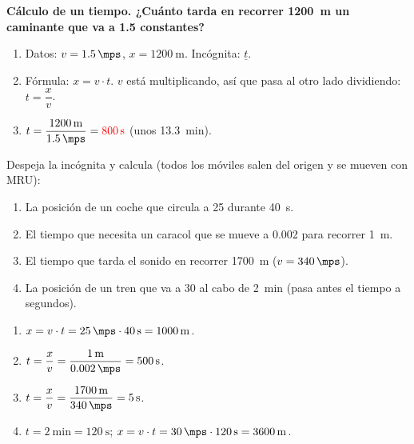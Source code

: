 \begin{example}
    \textbf{Cálculo de un tiempo. ¿Cuánto tarda en recorrer \qty{1200}{\m} un caminante que va a \qty{1.5}{\mps} constantes?}
    \begin{enumerate}[label=\numberballmDarkTeal]
        \item Datos: \(v = \qty{1.5}{\mps}\), \(x = \qty{1200}{\m}\). Incógnita: \(\underline{t}\).
        \item Fórmula: \(x = v \cdot t\). \(v\) está multiplicando, así que pasa al otro lado dividiendo: \(t = \dfrac{x}{v}\).
        \item \(t = \dfrac{\qty{1200}{\m}}{\qty{1.5}{\mps}} = \textcolor{red}{\qty{800}{\s}}\) (unos \qty{13.3}{\minute}).
    \end{enumerate}
\end{example}

\begin{exercise}
    Despeja la incógnita y calcula (todos los móviles salen del origen y se mueven con MRU):
    \begin{enumerate}[label=\letraminuscula]
        \item La posición de un coche que circula a \qty{25}{\mps} durante \qty{40}{\s}.
        \item El tiempo que necesita un caracol que se mueve a \qty{0.002}{\mps} para recorrer \qty{1}{\m}.
        \item El tiempo que tarda el sonido en recorrer \qty{1700}{\m} (\(v = \qty{340}{\mps}\)).
        \item La posición de un tren que va a \qty{30}{\mps} al cabo de \qty{2}{\minute} (pasa antes el tiempo a segundos).
    \end{enumerate}
    \begin{solu}
        \begin{enumerate}[label=\alph*)]
            \item \(x = v \cdot t = \qty{25}{\mps} \cdot \qty{40}{\s} = \qty{1000}{\m}\).
            \item \(t = \dfrac{x}{v} = \dfrac{\qty{1}{\m}}{\qty{0.002}{\mps}} = \qty{500}{\s}\).
            \item \(t = \dfrac{x}{v} = \dfrac{\qty{1700}{\m}}{\qty{340}{\mps}} = \qty{5}{\s}\).
            \item \(t = \qty{2}{\minute} = \qty{120}{\s}\); \(x = v \cdot t = \qty{30}{\mps} \cdot \qty{120}{\s} = \qty{3600}{\m}\).
        \end{enumerate}
    \end{solu}
\end{exercise}

